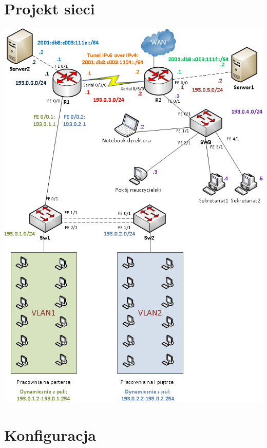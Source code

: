 \documentclass[11pt,a4paper]{article}
\begin{document}
\section{Projekt sieci}
\includegraphics[scale=0.6]{siec.png}  

\section{Konfiguracja}

\end{document}
